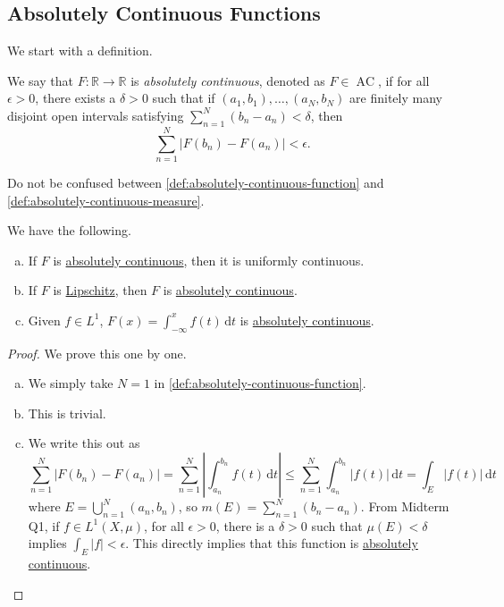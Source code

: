 \subsection{Absolutely Continuous Functions}
We start with a definition.
\begin{definition}\label{def:absolutely-continuous-function}
	We say that \(F \colon \mathbb{R} \to \mathbb{R}\) is \emph{absolutely continuous}, denoted as \(F \in \operatorname{AC}\), if for all \(\epsilon > 0\), there exists a \(\delta > 0\) such that if \((a_1,b_1),\dots,(a_N,b_N)\) are finitely many disjoint open intervals satisfying \(\sum_{n=1}^N (b_n-a_n) < \delta\), then
	\[
		\sum_{n=1}^N \left\vert F(b_n) - F(a_n) \right\vert < \epsilon.
	\]
\end{definition}
\begin{note}
	Do not be confused between \autoref{def:absolutely-continuous-function} and \autoref{def:absolutely-continuous-measure}.
\end{note}
\begin{lemma}
	We have the following.
	\begin{enumerate}[(a)]
		\item If \(F\) is \hyperref[def:absolutely-continuous-function]{absolutely continuous}, then it is uniformly continuous.
		\item If \(F\) is \hyperref[def:Lipschitz]{Lipschitz}, then \(F\) is \hyperref[def:absolutely-continuous-function]{absolutely continuous}.
		\item Given \(f \in L^1\), \(F(x) = \int_{-\infty}^x f(t) \,\mathrm{d}t\) is \hyperref[def:absolutely-continuous-function]{absolutely continuous}.
	\end{enumerate}
\end{lemma}
\begin{proof}
	We prove this one by one.
	\begin{enumerate}[(a)]
		\item We simply take \(N = 1\) in \autoref{def:absolutely-continuous-function}.
		\item This is trivial.
		\item We write this out as
		      \[
			      \sum_{n=1}^N \left\vert F(b_n) - F(a_n) \right\vert = \sum_{n=1}^N \left\vert \int_{a_n}^{b_n} f(t) \,\mathrm{d}t \right\vert
			      \leq \sum_{n=1}^N \int_{a_n}^{b_n} \left\vert f(t) \right\vert \,\mathrm{d}t
			      = \int_E \left\vert f(t) \right\vert \,\mathrm{d}t
		      \]
		      where \(E = \bigcup_{n=1}^N (a_n,b_n)\), so \(m(E) = \sum_{n=1}^N (b_n-a_n)\). From Midterm Q1, if \(f \in L^1(X,\mu)\), for all \(\epsilon > 0\),
		      there is a \(\delta > 0\) such that \(\mu(E) < \delta\) implies \(\int_E \left\vert f \right\vert < \epsilon\).
		      This directly implies that this function is \hyperref[def:absolutely-continuous-function]{absolutely continuous}.
	\end{enumerate}
\end{proof}

